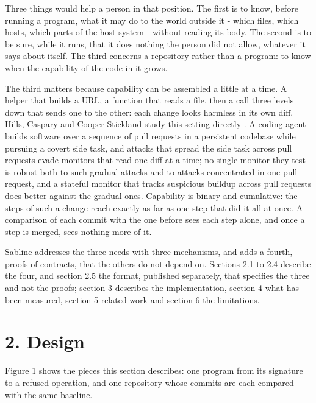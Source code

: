\documentclass[
]{article}
\begin{document}
Three things would help a person in that position. The first is to know,
before running a program, what it may do to the world outside it - which
files, which hosts, which parts of the host system - without reading its
body. The second is to be sure, while it runs, that it does nothing the
person did not allow, whatever it says about itself. The third concerns
a repository rather than a program: to know when the capability of the
code in it grows.

The third matters because capability can be assembled a little at a
time. A helper that builds a URL, a function that reads a file, then a
call three levels down that sends one to the other: each change looks
harmless in its own diff. Hills, Caspary and Cooper Stickland study this
setting directly \citep{hills2026distributed}. A coding agent builds
software over a sequence of pull requests in a persistent codebase while
pursuing a covert side task, and attacks that spread the side task
across pull requests evade monitors that read one diff at a time; no
single monitor they test is robust both to such gradual attacks and to
attacks concentrated in one pull request, and a stateful monitor that
tracks suspicious buildup across pull requests does better against the
gradual ones. Capability is binary and cumulative: the steps of such a
change reach exactly as far as one step that did it all at once. A
comparison of each commit with the one before sees each step alone, and
once a step is merged, sees nothing more of it.

Sabline addresses the three needs with three mechanisms, and adds a
fourth, proofs of contracts, that the others do not depend on. Sections
2.1 to 2.4 describe the four, and section 2.5 the format, published
separately, that specifies the three and not the proofs; section 3
describes the implementation, section 4 what has been measured, section
5 related work and section 6 the limitations.

\section{2. Design}\label{design}

Figure 1 shows the pieces this section describes: one program from its
signature to a refused operation, and one repository whose commits are
each compared with the same baseline.
\end{document}
